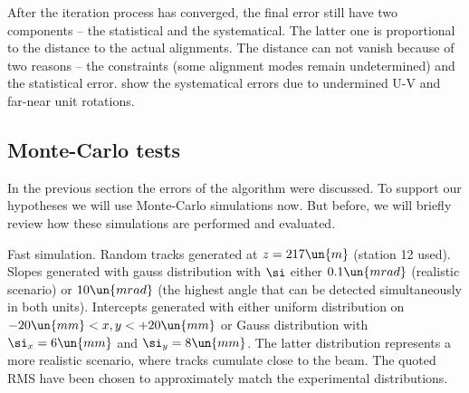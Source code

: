 After the iteration process has converged, the final error still have two components -- the statistical and the systematical. The latter one is proportional to the distance to the actual alignments. The distance can not vanish because of two reasons -- the constraints (some alignment modes remain undetermined) and the statistical error.  show the systematical errors due to undermined U-V and far-near unit rotations. 




\subsection[al mc tests]{Monte-Carlo tests}


In the previous section the errors of the algorithm were discussed. To support our hypotheses we will use Monte-Carlo simulations now. But before, we will briefly review how these simulations are performed and evaluated.

Fast simulation. Random tracks generated at $z=217\un{m}$ (station 12 used). Slopes generated with gauss distribution with $\si$ either $0.1\un{mrad}$ (realistic scenario) or $10\un{mrad}$ (the highest angle that can be detected simultaneously in both units). Intercepts generated with either uniform distribution on $ -20\un{mm} < x, y < +20\un{mm}$ or Gauss distribution with $\si_x = 6\un{mm}$ and $\si_y = 8\un{mm}$. The latter distribution represents a more realistic scenario, where tracks cumulate close to the beam. The quoted RMS have been chosen to approximately match the experimental distributions.

